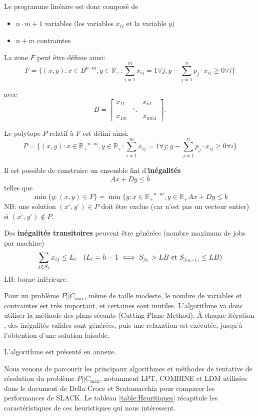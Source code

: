 \documentclass[a4paper,12pt]{report}
\theoremstyle{plain}				%
\theoremstyle{definition}				%
\newcommand\problemGrahamP{$P||C_{\max}$\xspace}
\begin{document}
Le programme linéaire est donc composé de
\begin{itemize}
\item $n \cdot m + 1$ variables (les variables $x_{ij}$ et la variable $y$)
\item $n+m$ contraintes
\end{itemize}

La zone $F$ peut être définie ainsi:
\[
  F=\{ (x,y) : x \in B^{n \cdot m}, y \in \mathbb{R_+} : \sum_{i=1}^{m} x_{ij}=1 \forall j;
y-\sum_{j=1}^{n} p_j \cdot x_{ij} \geq 0 \forall i \}
\]

avec
\[
B=\begin{bmatrix}
x_{11}& &x_{n1}\\
& \ddots & \\
x_{1m}& &x_{nm1}
\end{bmatrix}.
\]

Le polytope $P$ relatif à $F$ est défini ainsi:
\[
  P=\{ (x,y) : x \in \mathbb{R_+}^{n \cdot m}, y \in \mathbb{R_+} : \sum_{i=1}^{m} x_{ij}=1 \forall j;
  y-\sum_{j=1}^{n} p_j \cdot x_{ij} \geq 0 \forall i	\}
\]

Il est possible de construire un ensemble fini d'\textbf{inégalités}
\[
  Ax+Dy \leq \overline{b}
\]
telles que
\[
  \min \{y : (x,y) \in F \} = \min \{y : x \in \mathbb{R_+}^{n \cdot m}, y \in \mathbb{R_+} Ax+Dy \leq \underline{b}
\]
NB: une solution
$(x \ensuremath{^\circ} , y\ensuremath{^\circ}) \in P$ doit être
exclue (car n'est pas un vecteur entier) si
$(x\ensuremath{^\circ}, y\ensuremath{^\circ}) \notin P $.

\bigskip

Des \textbf{inégalités transitoires} peuvent être générées (nombre
maximum de jobs par machine)
\[
  \sum_{j \in S_i} x_{ij} \leq L_i \quad (L_i = h-1 \iff S_{j_h} > LB
  \textnormal{ et } S_{j_{(h-1)}} \leq LB)
\]
LB: borne inférieure.

\bigskip

Pour un problème \problemGrahamP, même de taille modeste, le nombre de
variables et contraintes est très important, et certaines sont
inutiles.
L'algorithme va donc utiliser la méthode des plans sécants (Cutting
Plane Method).
\`A chaque itération , des inégalités valides sont générées, puis une
relaxation est exécutée, jusqu'à l'obtention d'une solution faisable.

L'algorithme est présenté en annexe.

\bigskip
Nous venons de parcourir les principaux algorithmes et méthodes de tentative de résolution du problème \problemGrahamP, 
  notamment LPT, COMBINE et LDM 
  utilisées dans le document de Della Croce et Scatamacchia \cite{della2020longest} 
  pour comparer les performances de SLACK. 
Le tableau \ref{table:Heuritiques} récapitule les caractéristiques de ces heuristiques qui nous intéressent.
\end{document}
